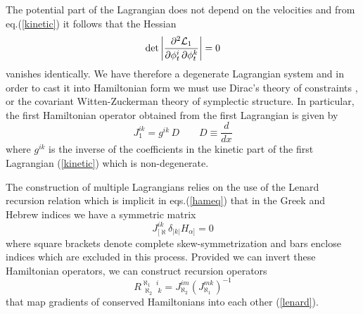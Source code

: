\documentclass[a4paper,12pt]{article}
\begin{document}
The potential part of the Lagrangian does not depend on the
velocities and from eq.(\ref{kinetic}) it follows that the Hessian
$$ \det \left| \frac{\partial^2 {\cal L}_1}{\partial \phi^i_t \,
\partial \phi^k_t} \right| = 0 $$
vanishes identically. We have therefore a degenerate Lagrangian
system and in order to cast it into Hamiltonian form we must use
Dirac's theory of constraints \cite{dirac}, or the covariant
Witten-Zuckerman theory \cite{witten,zuck} of symplectic
structure. In particular, the first Hamiltonian operator obtained
from the first Lagrangian is given by
\begin{equation}
J^{ik}_{1}  = g^{ik} \, D   \qquad D \equiv \frac{d}{d x}
\label{j0}
\end{equation}
where $g^{ik}$ is the inverse of the coefficients in the kinetic
part of the first Lagrangian (\ref{kinetic}) which is
non-degenerate.

The construction of multiple Lagrangians relies on the use of the
Lenard recursion relation which is implicit in eqs.(\ref{hameq})
that in the Greek and Hebrew indices we have a symmetric matrix
\begin{equation}
J^{ik}_{[\aleph}  \delta_{|k|} H_{\alpha]} =0 \label{lenard}
\end{equation}
where square brackets denote complete skew-symmetrization and bars enclose
indices which are excluded in this process.
Provided we can invert these Hamiltonian operators,
we can construct recursion operators
\begin{equation}
   R_{\;\aleph_2 \; \;k}^{\aleph_1 \;\; i} = J_{\aleph_2}^{im}
   (J^{mk}_{\aleph_1})^{-1}
\label{recop}
\end{equation}
that map gradients of conserved Hamiltonians into each other (\ref{lenard}).
\end{document}
